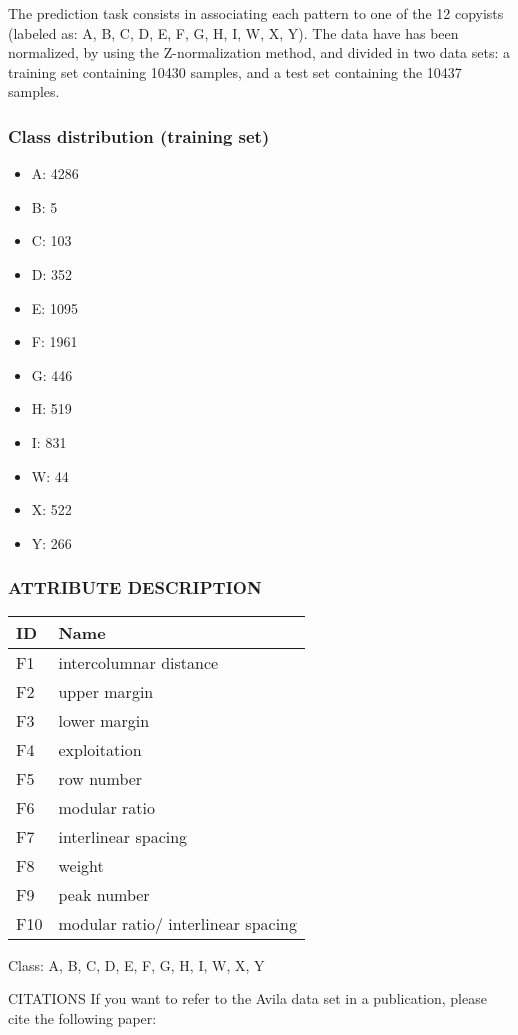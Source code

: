 \documentclass[11pt]{article}
\providecommand{\tightlist}{%
      \setlength{\itemsep}{0pt}\setlength{\parskip}{0pt}}
\begin{document}
The prediction task consists in associating each pattern to one of the
12 copyists (labeled as: A, B, C, D, E, F, G, H, I, W, X, Y). The data
have has been normalized, by using the Z-normalization method, and
divided in two data sets: a training set containing 10430 samples, and a
test set containing the 10437 samples.

\subsubsection{Class distribution (training
set)}\label{class-distribution-training-set}

\begin{itemize}
\tightlist
\item
  A: 4286
\item
  B: 5\\
\item
  C: 103
\item
  D: 352
\item
  E: 1095
\item
  F: 1961
\item
  G: 446
\item
  H: 519
\item
  I: 831
\item
  W: 44
\item
  X: 522
\item
  Y: 266
\end{itemize}

\subsubsection{ATTRIBUTE DESCRIPTION}\label{attribute-description}

\begin{longtable}[]{@{}ll@{}}
\toprule
ID & Name\tabularnewline
\midrule
\endhead
F1 & intercolumnar distance\tabularnewline
F2 & upper margin\tabularnewline
F3 & lower margin\tabularnewline
F4 & exploitation\tabularnewline
F5 & row number\tabularnewline
F6 & modular ratio\tabularnewline
F7 & interlinear spacing\tabularnewline
F8 & weight\tabularnewline
F9 & peak number\tabularnewline
F10 & modular ratio/ interlinear spacing\tabularnewline
\bottomrule
\end{longtable}

Class: A, B, C, D, E, F, G, H, I, W, X, Y

CITATIONS If you want to refer to the Avila data set in a publication,
please cite the following paper:
\end{document}
